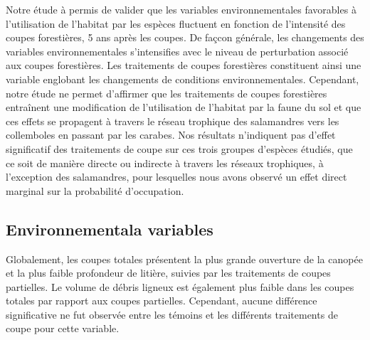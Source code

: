 Notre étude à permis de valider que les variables environnementales favorables à l'utilisation de l'habitat par les espèces fluctuent en fonction de l'intensité des coupes forestières, 5 ans après les coupes. 
De façcon générale, les changements des variables environnementales s'intensifies avec le niveau de perturbation associé aux coupes forestières.   
Les traitements de coupes forestières constituent ainsi une variable englobant les changements de conditions environnementales. 
Cependant, notre étude ne permet d'affirmer que les traitements de coupes forestières entraînent une modification de l'utilisation de l'habitat 
par la faune du sol et que ces effets se propagent à travers le réseau trophique des salamandres vers les collemboles en passant par les carabes. 
Nos résultats n’indiquent pas d’effet significatif des traitements de coupe sur ces trois groupes d’espèces étudiés, que ce soit de manière directe ou indirecte à travers les réseaux trophiques, 
à l’exception des salamandres, pour lesquelles nous avons observé un effet direct marginal sur la probabilité d’occupation. 


\subsection*{Environnementala variables}
\label{disc:env_var}

Globalement, les coupes totales présentent la plus grande ouverture de la canopée et la plus faible profondeur de litière, suivies par les traitements de coupes partielles. 
Le volume de débris ligneux est également plus faible dans les coupes totales par rapport aux coupes partielles. 
Cependant, aucune différence significative ne fut observée entre les témoins et les différents traitements de coupe pour cette variable.


